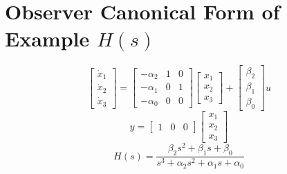 \documentclass[10pt,a4paper,oneside]{article}
\begin{document}
\section{Observer Canonical Form of Example $H(s)$}
\[
\left[\begin{array}{c}{\dot{x}_{1}} \\ {\dot{x}_{2}} \\ {\dot{x}_{3}}\end{array}\right]=\left[\begin{array}{ccc}{-\alpha_{2}} & {1} & {0} \\ {-\alpha_{1}} & {0} & {1} \\ {-\alpha_{0}} & {0} & {0}\end{array}\right]\left[\begin{array}{l}{x_{1}} \\ {x_{2}} \\ {x_{3}}\end{array}\right]+\left[\begin{array}{c}{\beta_{2}} \\ {\beta_{1}} \\ {\beta_{0}}\end{array}\right] u
\]
\[
y=\left[\begin{array}{lll}{1} & {0} & {0}\end{array}\right]\left[\begin{array}{l}{x_{1}} \\ {x_{2}} \\ {x_{3}}\end{array}\right]
\]
\[
H(s)=\frac{\beta_{2} s^{2}+\beta_{1} s+\beta_{0}}{s^{3}+\alpha_{2} s^{2}+\alpha_{1} s+\alpha_{0}}
\]
\end{document}
